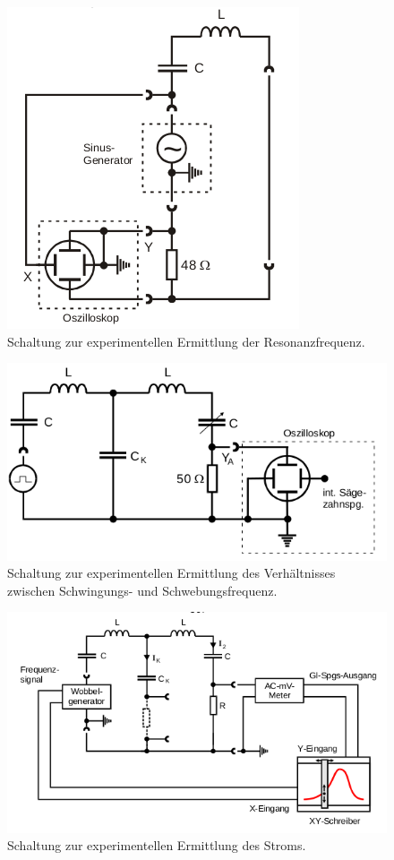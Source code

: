 \begin{figure}
    \centering
    \includegraphics[scale=0.7]{content/Bilder/Test.png}
    \caption{Schaltung zur experimentellen Ermittlung der Resonanzfrequenz.}
    \label{fig:Abb1}
    \end{figure}
    \begin{figure}
        \centering
        \includegraphics[scale=0.7]{content/Bilder/a_b.png}
        \caption{Schaltung zur experimentellen Ermittlung des Verhältnisses zwischen Schwingungs- und Schwebungsfrequenz.}
        \label{fig:Abb2}
        \end{figure}
\begin{figure}
    \centering
    \includegraphics[scale=0.7]{content/Bilder/c.png}
    \caption{Schaltung zur experimentellen Ermittlung des Stroms.}
    \label{fig:Abb3}
    \end{figure}


